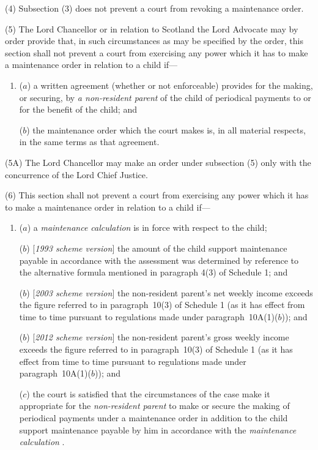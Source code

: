 \documentclass[12pt,a4paper]{article}
\begin{document}
(4) Subsection (3)  does not prevent a court from revoking a maintenance order.

(5) The Lord Chancellor or in relation to Scotland the Lord Advocate may by order provide that, in such circumstances as may be specified by the order, this section shall not prevent a court from exercising any power which it has to make a maintenance order in relation to a child if—
\begin{enumerate}\item[]
($a$) a written agreement (whether or not enforceable) provides for the making, or securing, by 
\emph{a non-resident parent}  %
of the child of periodical payments to or for the benefit of the child; and

($b$) the maintenance order which the court makes is, in all material respects, in the same terms as that agreement.
\end{enumerate}

(5A) The Lord Chancellor may make an order under subsection (5) only with the concurrence of the Lord Chief Justice.

(6) This section shall not prevent a court from exercising any power which it has to make a maintenance order in relation to a child if—
\begin{enumerate}\item[]
($a$) a 
\emph{maintenance calculation}  %
is in force with respect to the child;

($b$) [\emph{1993 scheme version}] the amount of the child support maintenance payable in accordance with the assessment was determined by reference to the alternative formula mentioned in paragraph 4(3)  of Schedule 1; and

($b$) [\emph{2003 scheme version}] the non-resident parent’s net weekly income exceeds the figure referred to in paragraph~10(3)  of Schedule 1 (as it has effect from time to time pursuant to regulations made under paragraph~10A(1)($b$)); and

($b$) [\emph{2012 scheme version}] the non-resident parent’s 
gross  %
weekly income exceeds the figure referred to in paragraph~10(3)  of Schedule 1 (as it has effect from time to time pursuant to regulations made under paragraph~10A(1)($b$)); and

($c$) the court is satisfied that the circumstances of the case make it appropriate for the 
\emph{non-resident parent}  %
to make or secure the making of periodical payments under a maintenance order in addition to the child support maintenance payable by him in accordance with the 
\emph{maintenance calculation}%
.
\end{enumerate}
\end{document}
